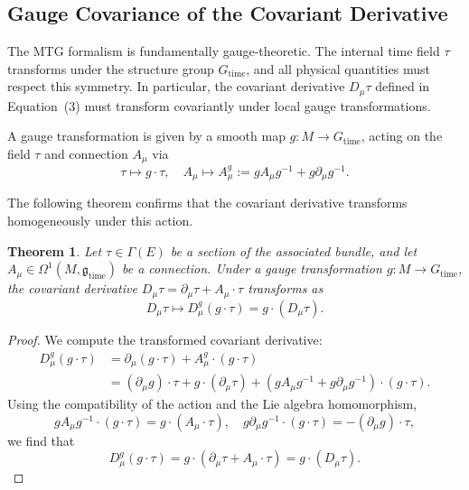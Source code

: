 \documentclass[11pt]{article}
\newtheorem{theorem}{Theorem}
\begin{document}
\subsection{Gauge Covariance of the Covariant Derivative}

The MTG formalism is fundamentally gauge-theoretic. The internal time field \( \tau \) transforms under the structure group \( G_{\text{time}} \), and all physical quantities must respect this symmetry. In particular, the covariant derivative \( D_\mu \tau \) defined in Equation~(3) must transform covariantly under local gauge transformations.

A gauge transformation is given by a smooth map \( g: M \to G_{\text{time}} \), acting on the field \( \tau \) and connection \( A_\mu \) via
\begin{equation}
\tau \mapsto g \cdot \tau, \quad A_\mu \mapsto A^g_\mu := g A_\mu g^{-1} + g \partial_\mu g^{-1}.
\end{equation}

The following theorem confirms that the covariant derivative transforms homogeneously under this action.

\begin{theorem}\label{thm:gauge_cov}
Let \( \tau \in \Gamma(E) \) be a section of the associated bundle, and let \( A_\mu \in \Omega^1(M, \mathfrak{g}_{\text{time}}) \) be a connection. Under a gauge transformation \( g: M \to G_{\text{time}} \), the covariant derivative \( D_\mu \tau = \partial_\mu \tau + A_\mu \cdot \tau \) transforms as
\begin{equation}
D_\mu \tau \mapsto D_\mu^g (g \cdot \tau) = g \cdot (D_\mu \tau).
\end{equation}
\end{theorem}

\begin{proof}
We compute the transformed covariant derivative:
\begin{align}
D_\mu^g (g \cdot \tau) &= \partial_\mu (g \cdot \tau) + A_\mu^g \cdot (g \cdot \tau) \\
&= (\partial_\mu g) \cdot \tau + g \cdot (\partial_\mu \tau) + \left( g A_\mu g^{-1} + g \partial_\mu g^{-1} \right) \cdot (g \cdot \tau).
\end{align}
Using the compatibility of the action and the Lie algebra homomorphism,
\begin{equation}
g A_\mu g^{-1} \cdot (g \cdot \tau) = g \cdot (A_\mu \cdot \tau), \quad
g \partial_\mu g^{-1} \cdot (g \cdot \tau) = -(\partial_\mu g) \cdot \tau,
\end{equation}
we find that
\begin{equation}
D_\mu^g (g \cdot \tau) = g \cdot (\partial_\mu \tau + A_\mu \cdot \tau) = g \cdot (D_\mu \tau).
\end{equation}
\end{proof}
\end{document}
